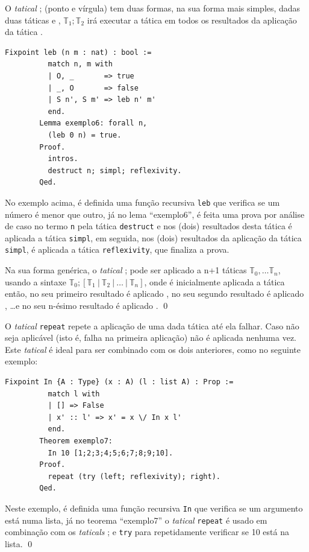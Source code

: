 			\begin{exemplo}
				O \textit{tatical} ; (ponto e vírgula) tem duas formas, na sua forma mais simples, dadas duas táticas  e ,
				\(\mathbb{T}_{1};\mathbb{T}_{2}\) irá executar a tática  em todos os resultados da aplicação da tática .
				\begin{lstlisting}[language=coq]
		Fixpoint leb (n m : nat) : bool :=
		  match n, m with
		  | O, _       => true
		  | _, O       => false
		  | S n', S m' => leb n' m'
		  end.
		Lemma exemplo6: forall n,
		  (leb 0 n) = true.
		Proof.
		  intros.
		  destruct n; simpl; reflexivity.
		Qed.
				\end{lstlisting}
				No exemplo acima, é definida uma função recursiva \texttt{leb} que verifica se um número é menor que outro, já no lema ``exemplo6'',
				é feita uma prova por análise de caso no termo \texttt{n} pela tática \texttt{destruct} e nos (dois) resultados desta tática é aplicada a
				tática \texttt{simpl}, em seguida, nos (dois) resultados da aplicação da tática \texttt{simpl}, é aplicada a tática \texttt{reflexivity}, que finaliza a prova.

				Na sua forma genérica, o \textit{tatical} ; pode ser aplicado a n+1 táticas \(\mathbb{T}_{0}, \dots \mathbb{T}_{n}\), usando a sintaxe
				\(\mathbb{T}_{0}; [\mathbb{T}_{1} \ | \ \mathbb{T}_{2} \ | \ \dots \ | \ \mathbb{T}_{n}]\), onde é inicialmente aplicada a tática  então,
				no seu primeiro resultado é aplicado , no seu segundo resultado é aplicado , \ldots e no seu n-ésimo resultado é aplicado . \qed
			\end{exemplo}

			\begin{exemplo}
				O \textit{tatical} \texttt{repeat} repete a aplicação de uma dada tática  até ela falhar. Caso  não seja aplicável (isto é, falha na
				primeira aplicação) não é aplicada nenhuma vez. Este \textit{tatical} é ideal para ser combinado com os dois anteriores, como no seguinte exemplo:
				\begin{lstlisting}[language=coq]
		Fixpoint In {A : Type} (x : A) (l : list A) : Prop :=
		  match l with
		  | [] => False
		  | x' :: l' => x' = x \/ In x l'
		  end.
		Theorem exemplo7:
		  In 10 [1;2;3;4;5;6;7;8;9;10].
		Proof.
		  repeat (try (left; reflexivity); right).
		Qed.
				\end{lstlisting}
				Neste exemplo, é definida uma função recursiva \texttt{In} que verifica se um argumento está numa lista, já no teorema ``exemplo7'' o
				\textit{tatical} \texttt{repeat} é usado em combinação com os \textit{taticals} ; e \texttt{try} para repetidamente verificar se 10 está na lista. \qed
			\end{exemplo}

